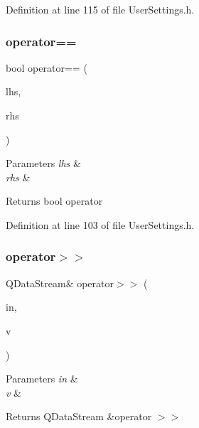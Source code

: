 Definition at line 115 of file User\+Settings.\+h.

\mbox{\label{structkeyfile_info_a6de7a195a408aea8febd1f44f99cacda}} 
\subsubsection{\texorpdfstring{operator==}{operator==}}
{\footnotesize\ttfamily bool operator== (\begin{DoxyParamCaption}\item[{const \hyperlink{structkeyfile_info}{keyfile\+Info} \&}]{lhs,  }\item[{const \hyperlink{structkeyfile_info}{keyfile\+Info} \&}]{rhs }\end{DoxyParamCaption})\hspace{0.3cm}{\ttfamily [friend]}}


\begin{DoxyParams}{Parameters}
{\em lhs} & \\
\hline
{\em rhs} & \\
\hline
\end{DoxyParams}
\begin{DoxyReturn}{Returns}
bool operator 
\end{DoxyReturn}


Definition at line 103 of file User\+Settings.\+h.

\mbox{\label{structkeyfile_info_addcf2b19a9de84f18aca5606598811f6}} 
\subsubsection{\texorpdfstring{operator$>$$>$}{operator>>}}
{\footnotesize\ttfamily Q\+Data\+Stream\& operator$>$$>$ (\begin{DoxyParamCaption}\item[{Q\+Data\+Stream \&}]{in,  }\item[{\hyperlink{structkeyfile_info}{keyfile\+Info} \&}]{v }\end{DoxyParamCaption})\hspace{0.3cm}{\ttfamily [friend]}}


\begin{DoxyParams}{Parameters}
{\em in} & \\
\hline
{\em v} & \\
\hline
\end{DoxyParams}
\begin{DoxyReturn}{Returns}
Q\+Data\+Stream \&operator $>$$>$ 
\end{DoxyReturn}


